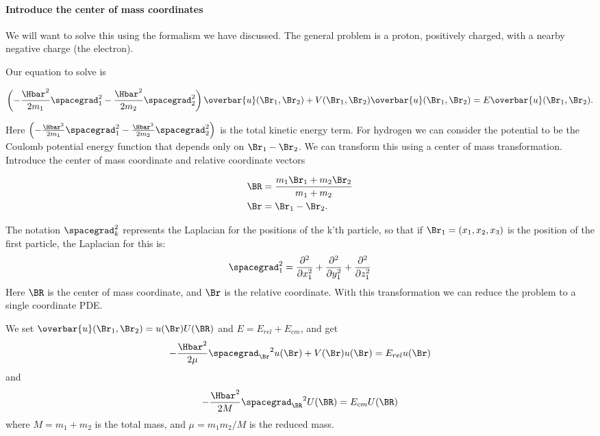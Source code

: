 %
%
%
\paragraph{Introduce the center of mass coordinates}
%
We will want to solve this using the formalism we have discussed.  The general problem is a proton, positively charged, with a nearby negative charge (the electron).

Our equation to solve is

\begin{align}\label{eqn:PHY356Lecture10:50}
\left(
-\frac{\Hbar^2}{2 m_1} \spacegrad_1^2
-\frac{\Hbar^2}{2 m_2} \spacegrad_2^2
\right)
\overbar{u}(\Br_1, \Br_2) +
V(\Br_1, \Br_2)
\overbar{u}(\Br_1, \Br_2)
=
E \overbar{u}(\Br_1, \Br_2).
\end{align}

Here \(\left( -\frac{\Hbar^2}{2 m_1} \spacegrad_1^2 -\frac{\Hbar^2}{2 m_2} \spacegrad_2^2 \right)\) is the total kinetic energy term.
For hydrogen we can consider the potential to be the Coulomb potential energy function that depends only on \(\Br_1 - \Br_2\).  We can transform this using a center of mass transformation.  Introduce the center of mass coordinate and relative coordinate vectors

\begin{align}\label{eqn:PHY356Lecture10:51}
\BR &= \frac{m_1 \Br_1 + m_2 \Br_2}{ m_1 + m_2 } \\
\Br &= \Br_1 - \Br_2.
\end{align}

The notation \(\spacegrad_k^2\) represents the Laplacian for the positions of the k'th particle, so that if \(\Br_1 = (x_1, x_2, x_3)\) is the position of the first particle, the Laplacian for this is:
%
\begin{equation}\label{eqn:PHY356FLecture10:52}
\spacegrad_1^2
=
\frac{\partial^2}{\partial x_1^2}
+\frac{\partial^2}{\partial y_1^2}
+\frac{\partial^2}{\partial z_1^2}
\end{equation}
%
Here \(\BR\) is the center of mass coordinate, and \(\Br\) is the relative coordinate.  With this transformation we can reduce the problem to a single coordinate PDE.

We set \(\overbar{u}(\Br_1, \Br_2) = u(\Br) U(\BR)\) and \(E = E_{rel} + E_{cm}\), and get
%
\begin{equation}\label{eqn:PHY356FLecture10:10}
-\frac{\Hbar^2}{2\mu} {\spacegrad_{\Br}}^2 u(\Br) + V(\Br) u(\Br) = E_{rel} u(\Br)
\end{equation}
and
\begin{equation}\label{eqn:PHY356FLecture10:20}
-\frac{\Hbar^2}{2M} {\spacegrad_{\BR}}^2 U(\BR) = E_{cm} U(\BR)
\end{equation}
%
where \(M = m_1 + m_2\) is the total mass, and \(\mu = m_1 m_2/M\) is the reduced mass.

